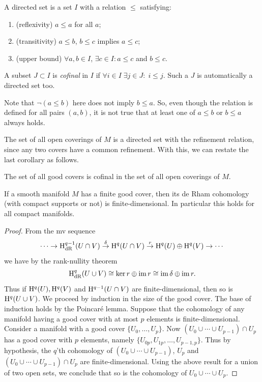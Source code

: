 \begin{defn}
    A directed set is a set $I$ with a relation $\leq $ satisfying:
    \begin{enumerate}
        \item (reflexivity) $a\leq a$ for all $a$;
        \item (transitivity) $a\leq b$, $b\leq c$ implies $a\leq c$;
        \item (upper bound) $\forall a,b\in I$, $\exists c\in I: a\leq c$ and $b\leq c$.
    \end{enumerate}
    A subset $J\subset I$ is \emph{cofinal} in $I$ if  $\forall i\in I\; \exists j\in J:\; i\leq j$. Such a $J$ is automatically a directed set too.
\end{defn}

Note that $\lnot (a\leq b)$ here does not imply $b\leq a$. So, even though the relation is defined for all pairs $(a,b)$, it is not true that at least one of $a\leq b$ or $b\leq a$ always holds.
    
The set of all open coverings of $M$ is a directed set with the refinement relation, since any two covers have a common refinement. With this, we can restate the last corollary as follows.

\begin{cor}
    The set of all good covers is cofinal in the set of all open coverings of $M$.
\end{cor}

\begin{prop}
    If a smooth manifold $M$ has a finite good cover, then its de Rham cohomology (with compact supports or not) is finite-dimensional. In particular this holds for all compact manifolds.
\end{prop}
\begin{proof}
     From the \gls{mv} sequence 
     \[\cdots\to \mathrm{H}^{q-1}_{\rm dR}(U\cap V)\overset{\delta}\to \mathrm{H}^q(U\cap V)\overset{r}\to \mathrm{H}^q(U)\oplus \mathrm{H}^q(V)\to\cdots\]
     we have by the rank-nullity theorem
     \[\mathrm{H}^q_{\rm dR}(U\cup V)\cong \ker r\oplus\operatorname{im} r\cong \operatorname{im} \delta\oplus\operatorname{im} r.\]
     Thus if $\mathrm{H}^q(U), \mathrm{H}^q(V)$ and $\mathrm{H}^{q-1}(U\cap V)$ are finite-dimensional, then so is $\mathrm{H}^q(U\cup V)$.
     We proceed by induction in the size of the good cover. The base of induction holds by the Poincar\'e lemma. Suppose that the cohomology of any manifold having a good cover with at most $p$ elements is finite-dimensional. Consider a manifold with a good cover $\{U_0,\ldots,U_{p}\}$. Now $(U_0\cup \cdots \cup U_{p-1})\cap U_{p}$ has a good cover with $p$ elements, namely $\{U_{0p},U_{1p},\ldots,U_{p-1,p}\}$. Thus by hypothesis, the $q$'th cohomology of $(U_0\cup \cdots \cup U_{p-1})$, $U_p$ and $(U_0\cup \cdots \cup U_{p-1})\cap U_{p}$ are finite-dimensional. Using the above result for a union of two open sets, we conclude that so is the cohomology of $U_0\cup \cdots\cup U_p$.
\end{proof}


